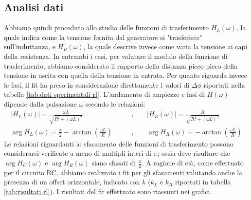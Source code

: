 \documentclass[a4paper]{article}
\begin{document}
\subsection{Analisi dati}
Abbiamo quindi proceduto allo studio delle funzioni di trasferimento $H_L(\omega)$, la quale indica come la tensione fornita dal generatore si "trasferisce" sull'induttanza, e $H_R(\omega)$, la quale descrive invece come varia la tensione ai capi della resistenza. In entrambi i casi, per valutare il modulo della funzione di trasferimento, abbiamo considerato il rapporto della distanza picco-picco della tensione in uscita con quella della tensione in entrata. Per quanto riguarda invece le fasi, il fit ha preso in considerazione direttamente i valori di $\Delta\phi$ riportati nella tabella \ref{tab:dati sperimentali rl}.
L'andamento di ampiezze e fasi di $H(\omega)$ dipende dalla pulsazione $\omega$ secondo le relazioni: 
\begin{align}
	 |H_L(\omega)| = \frac{\omega L}{\sqrt{R^2 + (\omega L)^2}} \qquad & \text{,} \qquad |H_R(\omega)| = \frac{R}{\sqrt{R^2 + (\omega L)^2}} \label{eq:ampiezza RL} \\
	 \arg H_L(\omega) = \frac{\pi}{2} - \arctan\left(\frac{\omega L}{R}\right) \qquad & \text{,} \qquad \arg H_R(\omega) = -\arctan\left(\frac{\omega L}{R}\right) \label{eq:fasi RL}
\end{align}
Le relazioni riguardanti lo sfasamento delle funzioni di trasferimento possono considerarsi verificate a meno di multipli interi di $\pi$; ossia deve risultare che $\arg H_C(\omega)$ e $\arg H_R(\omega)$ siano sfasati di $\frac{\pi}{2}$. A ragione di ciò, come effettuato per il circuito RC, abbiamo realizzato i fit per gli sfasamenti valutando anche la presenza di un offset orizzontale, indicato con $k$ ($k_L$ e $k_R$ riportati in tabella \ref{tab:risultati rl}).
I risultati del fit effettuato sono riassunti nei grafici.
\end{document}
